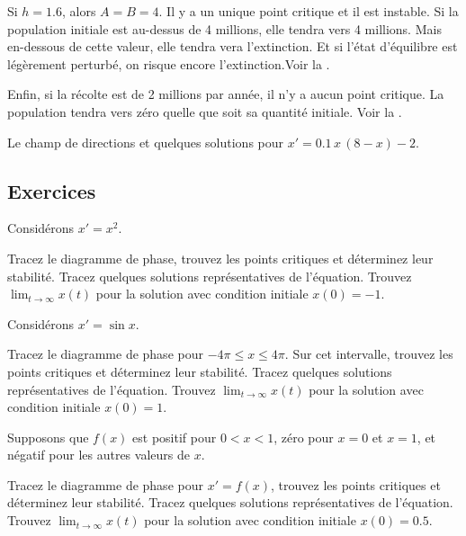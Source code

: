 Si $h = 1.6$, alors $A=B=4$.  Il y a un unique point critique et il est instable.  Si la population initiale est au-dessus de 4 millions, elle tendra vers 4 millions.  Mais en-dessous de cette valeur, elle tendra vera l'extinction.  Et si l'état d'équilibre est légèrement perturbé, on risque encore l'extinction.Voir la .

Enfin, si la récolte est de 2 millions par année, il n'y a aucun point critique.  La population tendra vers zéro quelle que soit sa quantité initiale.  Voir la .

\begin{myfig}
\capstart
{}
\caption{Le champ de directions et quelques solutions pour
$x' = 0.1\,x\,(8-x)-2$.\label{2.2:harv2}}
\end{myfig}


\subsection{Exercices}

\begin{samepage}
\begin{exercise}
Considérons $x' = x^2$.
\begin{tasks}
\task Tracez le diagramme de phase, trouvez les points critiques et déterminez leur stabilité.
\task Tracez quelques solutions représentatives de l'équation.
\task Trouvez $\displaystyle \lim_{t\to \infty} x(t)$ pour la solution avec condition initiale 
$x(0) = -1$.
\end{tasks}
\end{exercise}
\end{samepage}

\begin{exercise}
Considérons $x' = \sin x$.
\begin{tasks}
\task Tracez le diagramme de phase pour $-4\pi \leq x \leq 4\pi$.  Sur cet intervalle, trouvez les points critiques et déterminez leur stabilité. 
\task Tracez quelques solutions représentatives de l'équation.
\task Trouvez $\displaystyle \lim_{t\to \infty} x(t)$ pour la solution avec condition initiale  
$x(0) = 1$.
\end{tasks}
\end{exercise}

\begin{exercise}
Supposons que $f(x)$ est positif pour $0 < x < 1$, zéro pour $x=0$ et $x=1$,
et négatif pour les autres valeurs de $x$.
\begin{tasks}
\task Tracez le diagramme de phase pour $x' = f(x)$, trouvez les points critiques et déterminez leur stabilité. 
\task Tracez quelques solutions représentatives de l'équation.
\task Trouvez $\displaystyle \lim_{t\to \infty} x(t)$ pour la solution avec condition initiale 
$x(0) = 0.5$.
\end{tasks}
\end{exercise}

